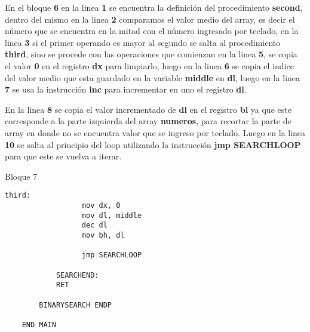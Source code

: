 \documentclass[a4paper,twoside]{article}
\newcommand{\codebordo}[1]{\textcolor{codebordo}{#1}}
\newcommand{\codeblue}[1]{\textcolor{codeblue}{#1}}
\begin{document}
  {\Large En el bloque \textbf{6} en la linea \textbf{1} se encuentra la definición del procedimiento \codeblue{\textbf{second}},
    dentro del mismo en la linea \textbf{2} comparamos el valor medio del array, es decir el número que se encuentra en la mitad
    con el número ingresado por teclado, en la linea \textbf{3} si el primer operando es mayor al segundo se salta al procedimiento 
    \codeblue{\textbf{third}}, sino se procede con las operaciones que comienzan en la linea \textbf{5}, se copia el valor \textbf{0} en el 
    registro \codebordo{\textbf{dx}} para limpiarlo, luego en la linea \textbf{6} se copia el indice del valor medio que esta 
    guardado en la variable \textbf{middle} en \codebordo{\textbf{dl}}, luego en la linea \textbf{7} se usa la instrucción \codeblue{\textbf{inc}}
    para incrementar en uno el registro \codebordo{\textbf{dl}}.
  }
  
  {\Large En la linea \textbf{8} se copia el valor incrementado de \codebordo{\textbf{dl}} en el registro \codebordo{\textbf{bl}}
    ya que este corresponde a la parte izquierda del array \textbf{numeros}, para recortar la parte de array en donde no se encuentra 
    valor que se ingreso por teclado.
    Luego en la linea \textbf{10} se salta al principio del loop utilizando la instrucción \codeblue{\textbf{jmp SEARCHLOOP}} para que 
    este se vuelva a iterar.
  }
  \vspace*{1cm}
  \begin{center}
    {\normalsize Bloque 7}
    \begin{lstlisting}[language=8086]      
              third:
                  mov dx, 0
                  mov dl, middle
                  dec dl
                  mov bh, dl
                  
                  jmp SEARCHLOOP
                      
            SEARCHEND:
            RET

        BINARYSEARCH ENDP

    END MAIN
    \end{lstlisting}
  \end{center} 
  \newpage
  \vspace*{-2cm}
\end{document}

